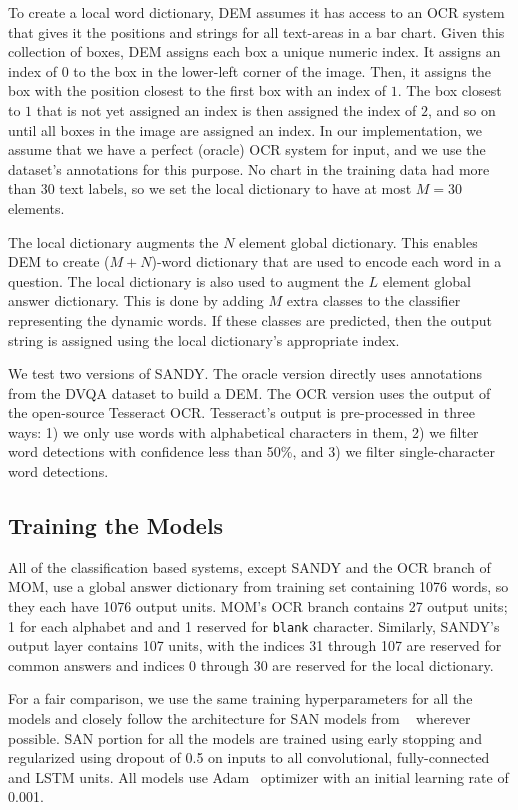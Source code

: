 \documentclass[10pt,twocolumn,letterpaper]{article}
\begin{document}
To create a local word dictionary, DEM assumes it has access to an OCR system that gives it the positions and strings for all text-areas in a bar chart. Given this collection of  boxes, DEM assigns each box a unique numeric index. It assigns an index of $0$ to the box in the lower-left corner of the image. Then, it assigns the box with the position closest to the first box with an index of $1$. The box closest to $1$ that is not yet assigned an index is then assigned the index of $2$, and so on until all boxes in the image are assigned an index. In our implementation, we assume that we have a perfect (oracle) OCR system for input, and we use the dataset's annotations for this purpose. No chart in the training data had more than 30 text labels, so we set the local dictionary to have at most $M=30$ elements.

The local dictionary augments the $N$ element global dictionary. This enables DEM to create ($M+N$)-word dictionary that are used to encode each word in a question. The local dictionary is also used to augment the $L$ element global answer dictionary. This is done by adding $M$ extra classes to the classifier representing the dynamic words. If these classes are predicted, then the output string is assigned using the local dictionary's appropriate index.

We test two versions of SANDY. The oracle version directly uses annotations from the DVQA dataset to build a DEM. The OCR version uses the output of the open-source Tesseract OCR. Tesseract's output is pre-processed in three ways: 1) we only use words with alphabetical characters in them, 2) we filter word detections with confidence less than 50\%, and 3) we filter single-character word detections.

\subsection{Training the Models}
\label{sec:training-details}

All of the classification based systems, except SANDY and the OCR branch of MOM, use a global answer dictionary from training set containing 1076 words, so they each have 1076 output units. MOM's OCR branch contains 27 output units; 1 for each alphabet and and 1 reserved for \texttt{blank} character. Similarly, SANDY's output layer contains 107 units, with the indices 31 through 107 are reserved for common answers and indices 0 through 30 are reserved for the local dictionary.

For a fair comparison, we use the same training hyperparameters for all the models and closely follow the architecture for SAN models from ~\cite{kazemi2017show} wherever possible. SAN portion for all the models are trained using early stopping and regularized using dropout of 0.5 on inputs to all convolutional, fully-connected and LSTM units. All models use Adam~\cite{kingma2014adam} optimizer with an initial learning rate of 0.001.
\end{document}
